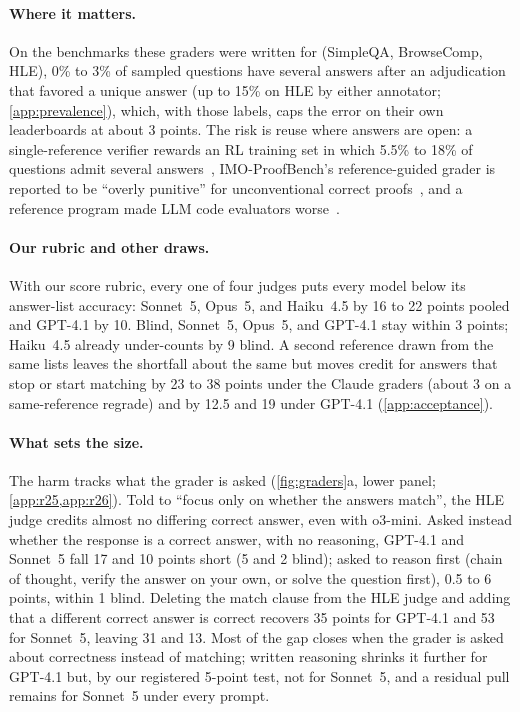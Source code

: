 \documentclass{article}
\begin{document}
\paragraph{Where it matters.}
On the benchmarks these graders were written for (SimpleQA, BrowseComp, HLE), 0\% to 3\% of sampled questions have several answers after an adjudication that favored a unique answer (up to 15\% on HLE by either annotator; \cref{app:prevalence}), which, with those labels, caps the error on their own leaderboards at about 3 points. The risk is reuse where answers are open: a single-reference verifier rewards an RL training set in which 5.5\% to 18\% of questions admit several answers~\citep{ma2025generalreasoner}, IMO-ProofBench's reference-guided grader is reported to be ``overly punitive'' for unconventional correct proofs~\citep{luong2025imobench}, and a reference program made LLM code evaluators worse~\citep{tong2024codejudge}.

\paragraph{Our rubric and other draws.}
With our score rubric, every one of four judges puts every model below its answer-list accuracy: Sonnet~5, Opus~5, and Haiku~4.5 by 16 to 22 points pooled and GPT-4.1 by 10. Blind, Sonnet~5, Opus~5, and GPT-4.1 stay within 3 points; Haiku~4.5 already under-counts by 9 blind. A second reference drawn from the same lists leaves the shortfall about the same but moves credit for answers that stop or start matching by 23 to 38 points under the Claude graders (about 3 on a same-reference regrade) and by 12.5 and 19 under GPT-4.1 (\cref{app:acceptance}).

\paragraph{What sets the size.}
The harm tracks what the grader is asked (\cref{fig:graders}a, lower panel; \cref{app:r25,app:r26}). Told to ``focus only on whether the answers match'', the HLE judge credits almost no differing correct answer, even with o3-mini. Asked instead whether the response is a correct answer, with no reasoning, GPT-4.1 and Sonnet~5 fall 17 and 10 points short (5 and 2 blind); asked to reason first (chain of thought, verify the answer on your own, or solve the question first), 0.5 to 6 points, within 1 blind. Deleting the match clause from the HLE judge and adding that a different correct answer is correct recovers 35 points for GPT-4.1 and 53 for Sonnet~5, leaving 31 and 13. Most of the gap closes when the grader is asked about correctness instead of matching; written reasoning shrinks it further for GPT-4.1 but, by our registered 5-point test, not for Sonnet~5, and a residual pull remains for Sonnet~5 under every prompt.
\end{document}
